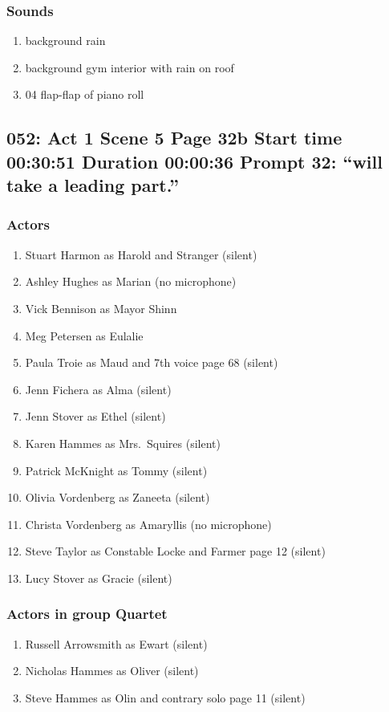 \subsubsection{Sounds}
\begin{enumerate}
\item background rain
\item background gym interior with rain on roof
\item 04 flap-flap of piano roll
\end{enumerate}
\subsection{052: Act 1 Scene 5 Page 32b Start time 00:30:51 Duration 00:00:36 Prompt 32: ``will take a leading part.''}

\subsubsection{Actors}
\begin{enumerate}
\item Stuart Harmon as Harold and Stranger (silent)
\item Ashley Hughes as Marian (no microphone)
\item Vick Bennison as Mayor Shinn
\item Meg Petersen as Eulalie
\item Paula Troie as Maud and 7th voice page 68 (silent)
\item Jenn Fichera as Alma (silent)
\item Jenn Stover as Ethel (silent)
\item Karen Hammes as Mrs.~Squires (silent)
\item Patrick McKnight as Tommy (silent)
\item Olivia Vordenberg as Zaneeta (silent)
\item Christa Vordenberg as Amaryllis (no microphone)
\item Steve Taylor as Constable Locke and Farmer page 12 (silent)
\item Lucy Stover as Gracie (silent)
\end{enumerate}
\subsubsection{Actors in group Quartet}
\begin{enumerate}
\item Russell Arrowsmith as Ewart (silent)
\item Nicholas Hammes as Oliver (silent)
\item Steve Hammes as Olin and contrary solo page 11 (silent)
\end{enumerate}
